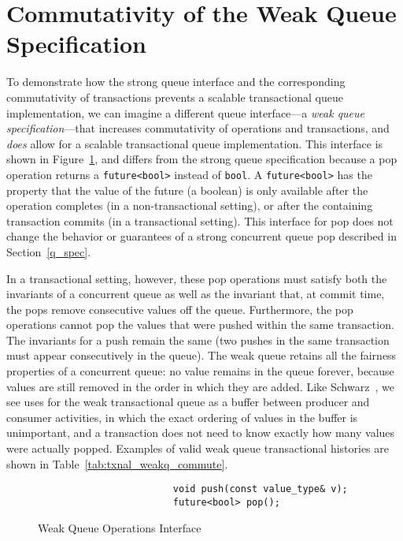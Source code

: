 \section{Commutativity of the Weak Queue Specification}
\label{wqueue}

To demonstrate how the strong queue interface and the corresponding commutativity of transactions prevents a scalable transactional queue implementation, we can imagine a different queue interface---a \emph{weak queue specification}---that increases commutativity of operations and transactions, and \emph{does} allow for a scalable transactional queue implementation. This interface is shown in Figure~\ref{fig:wq_interface}, and differs from the strong queue specification because a pop operation returns a \texttt{future<bool>} instead of \texttt{bool}. A \texttt{future<bool>} has the property that the value of the future (a boolean) is only available after the operation completes (in a non-transactional setting), or after the containing transaction commits (in a transactional setting). This interface for pop does not change the behavior or guarantees of a strong concurrent queue pop described in Section~\ref{q_spec}.
 
In a transactional setting, however, these pop operations must satisfy both the invariants of a concurrent queue as well as the invariant that, at commit time, the pops remove consecutive values off the queue. Furthermore, the pop operations cannot pop the values that were pushed within the same transaction. The invariants for a push remain the same (two pushes in the same transaction must appear consecutively in the queue). 
The weak queue retains all the fairness properties of a concurrent queue: no value remains in the queue forever, because values are still removed in the order in which they are added. Like Schwarz~\cite{schwarz}, we see uses for the weak transactional queue as a buffer between producer and consumer activities, in which the exact ordering of values in the buffer is unimportant, and a transaction does not need to know exactly how many values were actually popped. Examples of valid weak queue transactional histories are shown in Table~\ref{tab:txnal_weakq_commute}.
 

\begin{figure}[t]
    \centering
    \begin{lstlisting}
                        void push(const value_type& v); 
                        future<bool> pop();                     
    \end{lstlisting}
    \caption{Weak Queue Operations Interface}
    \label{fig:wq_interface}
\end{figure}

